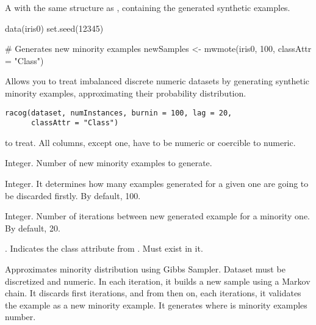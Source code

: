 %
\begin{Value}
A  with the same structure as ,
containing the generated synthetic examples.
\end{Value}
%
%
\begin{Examples}
\begin{ExampleCode}
data(iris0)
set.seed(12345)

# Generates new minority examples
newSamples <- mwmote(iris0, 100, classAttr = "Class")

\end{ExampleCode}
\end{Examples}
%
\begin{Description}\relax
Allows you to treat imbalanced discrete numeric datasets by generating
synthetic minority examples, approximating their probability distribution.
\end{Description}
%
\begin{Usage}
\begin{verbatim}
racog(dataset, numInstances, burnin = 100, lag = 20, 
      classAttr = "Class")
\end{verbatim}
\end{Usage}
%
\begin{Arguments}
\begin{ldescription}
\item[\code{dataset}]  to treat. All columns, except
 one, have to be numeric or coercible to numeric.

\item[\code{numInstances}] Integer. Number of new minority examples to generate.

\item[\code{burnin}] Integer. It determines how many examples generated for a given
one are going to be discarded firstly. By default, 100.

\item[\code{lag}] Integer. Number of iterations between new generated example for a
minority one. By default, 20.

\item[\code{classAttr}] . Indicates the class attribute from
. Must exist in it.
\end{ldescription}
\end{Arguments}
%
\begin{Details}\relax
Approximates minority distribution using Gibbs Sampler. Dataset must be
discretized and numeric. In each iteration, it builds a new sample using a
Markov chain. It discards first  iterations, and from then on,
each  iterations, it validates the example as a new minority
example. It generates  where  is
minority examples number.
\end{Details}
